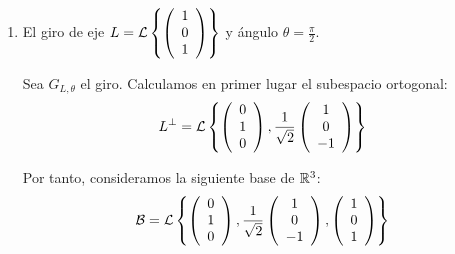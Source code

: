 \begin{ejercicio}
\begin{enumerate}
\begin{equation*}
\begin{split}
\begin{array}{c}
                     x_1 \\ x_2 \\ x_3
                \end{array}\right)
                \Longrightarrow
                M(s_{L}, \cc{B}_u) = \frac{1}{17}\left(\begin{array}{ccc}
                     -9 & 8 & -12 \\
                     8 & -9 & -12 \\
                     -12 & -12 & 1
                \end{array}\right)
        \end{split}\end{equation*}

        
        \item El giro de eje $L=\mathcal{L}\left\{\left(\begin{array}{c}
                     1 \\ 0 \\ 1
                \end{array}\right)\right\}$ y ángulo $\displaystyle \theta=\frac{\pi}{2}$.


        Sea $G_{L,\theta}$ el giro. Calculamos en primer lugar el subespacio ortogonal:
        \begin{equation*}
            L^\perp = \mathcal{L}\left\{
            \left(\begin{array}{c}
                 0 \\ 1 \\ 0
            \end{array}\right),
            \frac{1}{\sqrt{2}}
            \left(\begin{array}{c}
                 1 \\ 0 \\ -1
            \end{array}\right)
            \right\}
        \end{equation*}
        
        Por tanto, consideramos la siguiente base de $\mathbb{R}^3$:
        \begin{equation*}
            \mathcal{B} = \mathcal{L}\left\{
            \left(\begin{array}{c}
                 0 \\ 1 \\ 0
            \end{array}\right),
            \frac{1}{\sqrt{2}}
            \left(\begin{array}{c}
                 1 \\ 0 \\ -1
            \end{array}\right),
            \left(\begin{array}{c}
                 1 \\ 0 \\ 1
            \end{array}\right)
            \right\}
        \end{equation*}


\end{enumerate}
\end{ejercicio}
